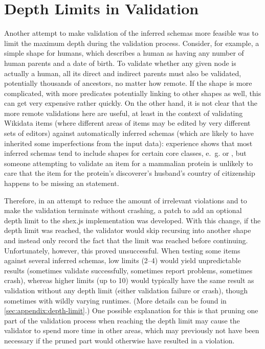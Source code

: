 \section{Depth Limits in Validation}
\label{sec:RDF2Graph+Wikidata:depth-limit}

Another attempt to make validation of the inferred \glspl{schema} more feasible
was to limit the maximum depth during the validation process. %
Consider, for example, a simple \gls{shape} for humans, %
which describes a human as having any number of human parents and a date of birth.
To validate whether any given node is actually a human,
all its direct and indirect parents must also be validated,
potentially thousands of ancestors, no matter how remote.
If the \gls{shape} is more complicated,
with more predicates potentially linking to other \glspl{shape} as well,
this can get very expensive rather quickly.
On the other hand, it is not clear that the more remote validations here are useful,
at least in the context of validating \gls{Wikidata} \glspl{item}
(where different areas of \glspl{item} may be edited by very different sets of editors)
against automatically inferred \glspl{schema}
(which are likely to have inherited some imperfections from the input data): %
experience shows that %
most inferred \glspl{schema} tend to include \glspl{shape} for certain core classes,
e.~g.  or ,
but someone attempting to validate an \gls{item} for a mammalian protein
is unlikely to care that the \gls{item} for the protein’s discoverer’s husband’s country of citizenship %
happens to be missing an  statement.

Therefore, %
in an attempt to reduce the amount of irrelevant violations
and to make the validation terminate without crashing,
a patch to add an optional depth limit to the shex.js implementation was developed.
With this change, if the depth limit was reached,
the validator would skip recursing into another \gls{shape}
and instead only record the fact that the limit was reached before continuing.
Unfortunately, however, this proved unsuccessful.
When testing some \glspl{item} against several inferred schemas,
low limits (2–4) would yield unpredictable results
(sometimes validate successfully, sometimes report problems, sometimes crash),
whereas higher limits (up to 10) would typically have the same result as validation without any depth limit
(either validation failure or crash),
though sometimes with wildly varying runtimes.
(More details can be found in \cref{sec:appendix:depth-limit}.)
One possible explanation for this is that pruning one part of the validation process when reaching the depth limit
may cause the validator to spend more time in other areas,
which may previously not have been necessary if the pruned part would otherwise have resulted in a violation.

